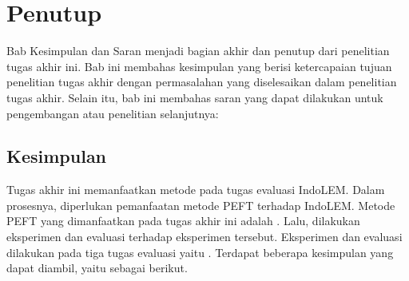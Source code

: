 \chapter{Penutup}

Bab Kesimpulan dan Saran  menjadi bagian akhir dan penutup dari penelitian tugas akhir ini. Bab ini  membahas kesimpulan yang berisi ketercapaian tujuan penelitian tugas akhir dengan permasalahan yang diselesaikan dalam penelitian tugas akhir. Selain itu, bab ini  membahas saran yang dapat dilakukan untuk pengembangan atau penelitian selanjutnya:

\section{Kesimpulan}

Tugas akhir ini memanfaatkan metode \PEFT pada tugas evaluasi IndoLEM. Dalam prosesnya, diperlukan pemanfaatan metode PEFT terhadap IndoLEM. Metode PEFT yang dimanfaatkan pada tugas akhir ini adalah \methodPEFT. Lalu, dilakukan eksperimen dan evaluasi terhadap eksperimen tersebut. Eksperimen dan evaluasi dilakukan pada tiga tugas evaluasi yaitu \nlptask. Terdapat beberapa kesimpulan yang dapat diambil, yaitu sebagai berikut.

